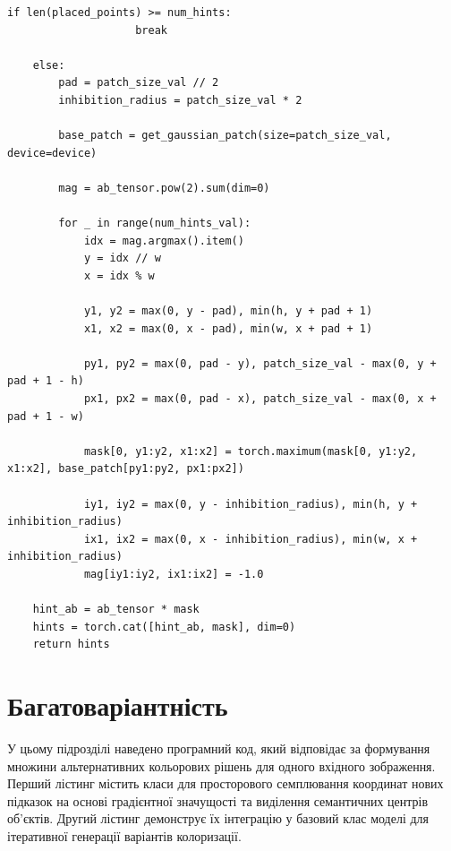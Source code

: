 \begin{lstlisting}[caption={Функція генерації Гауссівських підказок}]
                if len(placed_points) >= num_hints:
                    break

    else:
        pad = patch_size_val // 2
        inhibition_radius = patch_size_val * 2 

        base_patch = get_gaussian_patch(size=patch_size_val, device=device)

        mag = ab_tensor.pow(2).sum(dim=0) 

        for _ in range(num_hints_val):
            idx = mag.argmax().item()
            y = idx // w
            x = idx % w

            y1, y2 = max(0, y - pad), min(h, y + pad + 1)
            x1, x2 = max(0, x - pad), min(w, x + pad + 1)
            
            py1, py2 = max(0, pad - y), patch_size_val - max(0, y + pad + 1 - h)
            px1, px2 = max(0, pad - x), patch_size_val - max(0, x + pad + 1 - w)

            mask[0, y1:y2, x1:x2] = torch.maximum(mask[0, y1:y2, x1:x2], base_patch[py1:py2, px1:px2])

            iy1, iy2 = max(0, y - inhibition_radius), min(h, y + inhibition_radius)
            ix1, ix2 = max(0, x - inhibition_radius), min(w, x + inhibition_radius)
            mag[iy1:iy2, ix1:ix2] = -1.0

    hint_ab = ab_tensor * mask
    hints = torch.cat([hint_ab, mask], dim=0)
    return hints
\end{lstlisting}

\section{Багатоваріантність}
У цьому підрозділі наведено програмний код, який відповідає за формування множини альтернативних кольорових рішень для одного вхідного зображення. 
Перший лістинг містить класи для просторового семплювання координат нових підказок на основі градієнтної значущості та виділення семантичних центрів об'єктів. 
Другий лістинг демонструє їх інтеграцію у базовий клас моделі для ітеративної генерації варіантів колоризації.

